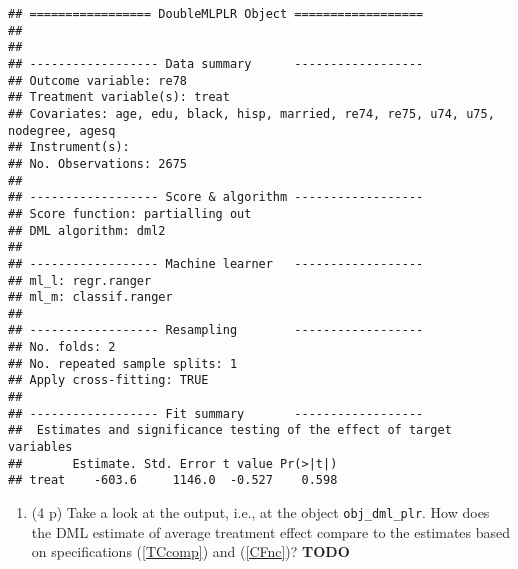 \documentclass[
]{article}
\newenvironment{Shaded}{\begin{snugshade}}{\end{snugshade}}
\newcommand{\FunctionTok}[1]{\textcolor[rgb]{0.13,0.29,0.53}{\textbf{#1}}}
\newcommand{\NormalTok}[1]{#1}
\newcommand{\SpecialCharTok}[1]{\textcolor[rgb]{0.81,0.36,0.00}{\textbf{#1}}}
\providecommand{\tightlist}{%
  \setlength{\itemsep}{0pt}\setlength{\parskip}{0pt}}
\begin{document}
\begin{enumerate}
\begin{Shaded}
\end{Shaded}

\begin{verbatim}
## ================= DoubleMLPLR Object ==================
## 
## 
## ------------------ Data summary      ------------------
## Outcome variable: re78
## Treatment variable(s): treat
## Covariates: age, edu, black, hisp, married, re74, re75, u74, u75, nodegree, agesq
## Instrument(s): 
## No. Observations: 2675
## 
## ------------------ Score & algorithm ------------------
## Score function: partialling out
## DML algorithm: dml2
## 
## ------------------ Machine learner   ------------------
## ml_l: regr.ranger
## ml_m: classif.ranger
## 
## ------------------ Resampling        ------------------
## No. folds: 2
## No. repeated sample splits: 1
## Apply cross-fitting: TRUE
## 
## ------------------ Fit summary       ------------------
##  Estimates and significance testing of the effect of target variables
##       Estimate. Std. Error t value Pr(>|t|)
## treat    -603.6     1146.0  -0.527    0.598
\end{verbatim}

  \begin{enumerate}
  \def\labelenumii{\roman{enumii}.}
  \tightlist
  \item
    (4 p) Take a look at the output, i.e., at the object
    \texttt{obj\_dml\_plr}. How does the DML estimate of average
    treatment effect compare to the estimates based on specifications
    (\ref{TCcomp}) and (\ref{CFnc})? \textbf{TODO}
  \end{enumerate}
\end{enumerate}
\end{document}
